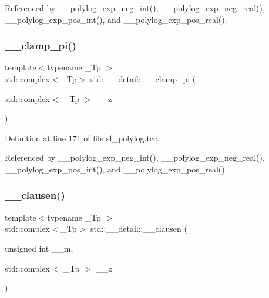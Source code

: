 Referenced by \+\_\+\+\_\+polylog\+\_\+exp\+\_\+neg\+\_\+int(), \+\_\+\+\_\+polylog\+\_\+exp\+\_\+neg\+\_\+real(), \+\_\+\+\_\+polylog\+\_\+exp\+\_\+pos\+\_\+int(), and \+\_\+\+\_\+polylog\+\_\+exp\+\_\+pos\+\_\+real().

\mbox{\label{namespacestd_1_1____detail_aa341299d514aa754403a775b9ed51c91}} 
\subsubsection{\texorpdfstring{\+\_\+\+\_\+clamp\+\_\+pi()}{\_\_clamp\_pi()}}
{\footnotesize\ttfamily template$<$typename \+\_\+\+Tp $>$ \\
std\+::complex$<$\+\_\+\+Tp$>$ std\+::\+\_\+\+\_\+detail\+::\+\_\+\+\_\+clamp\+\_\+pi (\begin{DoxyParamCaption}\item[{std\+::complex$<$ \+\_\+\+Tp $>$}]{\+\_\+\+\_\+z }\end{DoxyParamCaption})}



Definition at line 171 of file sf\+\_\+polylog.\+tcc.



Referenced by \+\_\+\+\_\+polylog\+\_\+exp\+\_\+neg\+\_\+int(), \+\_\+\+\_\+polylog\+\_\+exp\+\_\+neg\+\_\+real(), \+\_\+\+\_\+polylog\+\_\+exp\+\_\+pos\+\_\+int(), and \+\_\+\+\_\+polylog\+\_\+exp\+\_\+pos\+\_\+real().

\mbox{\label{namespacestd_1_1____detail_a8f7e931e2a93b8d298a4df702a5e41ad}} 
\subsubsection{\texorpdfstring{\+\_\+\+\_\+clausen()}{\_\_clausen()}\hspace{0.1cm}{\footnotesize\ttfamily [1/2]}}
{\footnotesize\ttfamily template$<$typename \+\_\+\+Tp $>$ \\
std\+::complex$<$\+\_\+\+Tp$>$ std\+::\+\_\+\+\_\+detail\+::\+\_\+\+\_\+clausen (\begin{DoxyParamCaption}\item[{unsigned int}]{\+\_\+\+\_\+m,  }\item[{std\+::complex$<$ \+\_\+\+Tp $>$}]{\+\_\+\+\_\+z }\end{DoxyParamCaption})}

